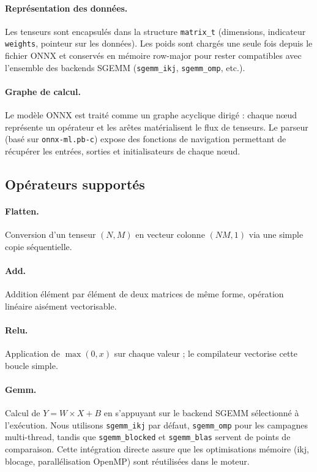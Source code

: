 \documentclass[a4paper,11pt]{article}
\begin{document}
\paragraph{Représentation des données.} Les tenseurs sont encapsulés dans la structure \texttt{matrix\_t} (dimensions, indicateur \texttt{weights}, pointeur sur les données). Les poids sont chargés une seule fois depuis le fichier ONNX et conservés en mémoire row-major pour rester compatibles avec l'ensemble des backends SGEMM (\texttt{sgemm\_ikj}, \texttt{sgemm\_omp}, etc.).

\paragraph{Graphe de calcul.} Le modèle ONNX est traité comme un graphe acyclique dirigé : chaque nœud représente un opérateur et les arêtes matérialisent le flux de tenseurs. Le parseur (basé sur \texttt{onnx-ml.pb-c}) expose des fonctions de navigation permettant de récupérer les entrées, sorties et initialisateurs de chaque nœud.

\subsection{Opérateurs supportés}

\paragraph{Flatten.} Conversion d'un tenseur $(N, M)$ en vecteur colonne $(NM, 1)$ via une simple copie séquentielle.

\paragraph{Add.} Addition élément par élément de deux matrices de même forme, opération linéaire aisément vectorisable.

\paragraph{Relu.} Application de $\max(0, x)$ sur chaque valeur ; le compilateur vectorise cette boucle simple.

\paragraph{Gemm.} Calcul de $Y = W \times X + B$ en s'appuyant sur le backend SGEMM sélectionné à l'exécution. Nous utilisons \texttt{sgemm\_ikj} par défaut, \texttt{sgemm\_omp} pour les campagnes multi-thread, tandis que \texttt{sgemm\_blocked} et \texttt{sgemm\_blas} servent de points de comparaison. Cette intégration directe assure que les optimisations mémoire (ikj, blocage, parallélisation OpenMP) sont réutilisées dans le moteur.
\end{document}
